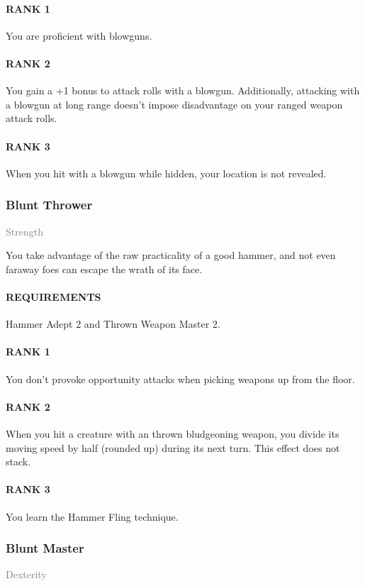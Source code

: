 \paragraph{RANK 1} You are proficient with blowguns.
\paragraph{RANK 2} You gain a +1 bonus to attack rolls with a blowgun.
Additionally, attacking with a blowgun at long range doesn't impose disadvantage on your ranged weapon attack rolls.
\paragraph{RANK 3} When you hit with a blowgun while hidden, your location is not revealed.

\subsubsection{Blunt Thrower} \label{feat::bluntthrower}
\small{\textcolor{gray}{Strength}}

\normalsize
You take advantage of the raw practicality of a good hammer, and not even faraway foes can escape the wrath of its face.
\paragraph{REQUIREMENTS} Hammer Adept 2 and Thrown Weapon Master 2.
\paragraph{RANK 1} You don't provoke opportunity attacks when picking weapons up from the floor.
\paragraph{RANK 2} When you hit a creature with an thrown bludgeoning weapon, you divide its moving speed by half (rounded up) during its next turn.
This effect does not stack.
\paragraph{RANK 3} You learn the Hammer Fling technique.

\subsubsection{Blunt Master} \label{feat::bluntmaster}
\small{\textcolor{gray}{Dexterity}}

